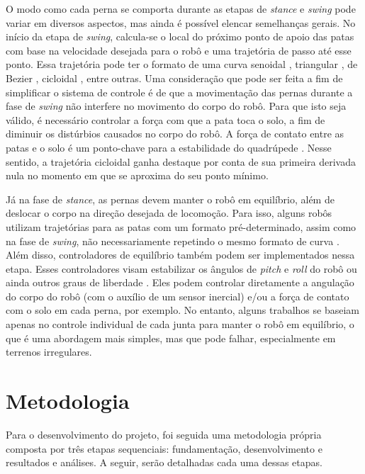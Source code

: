 \documentclass[conference]{IEEEtran}
\begin{document}
O modo como cada perna se comporta durante as etapas de \textit{stance} e \textit{swing} pode variar em diversos aspectos, mas ainda é possível elencar semelhanças gerais. No início da etapa de \textit{swing}, calcula-se o local do próximo ponto de apoio das patas com base na velocidade desejada para o robô e uma trajetória de passo até esse ponto. Essa trajetória pode ter o formato de uma curva senoidal \cite{X.118}, triangular \cite{StanfordPupper}, de Bezier \cite{HackadayQuadruped}, cicloidal \cite{Shi2021} \cite{X.58}, entre outras. Uma consideração que pode ser feita a fim de simplificar o sistema de controle é de que a movimentação das pernas durante a fase de \textit{swing} não interfere no movimento do corpo do robô. Para que isto seja válido, é necessário controlar a força com que a pata toca o solo, a fim de diminuir os distúrbios causados no corpo do robô. A força de contato entre as patas e o solo é um ponto-chave para a estabilidade do quadrúpede \cite{X.118}. Nesse sentido, a trajetória cicloidal ganha destaque por conta de sua primeira derivada nula no momento em que se aproxima do seu ponto mínimo.

Já na fase de \textit{stance}, as pernas devem manter o robô em equilíbrio, além de deslocar o corpo na direção desejada de locomoção. Para isso, alguns robôs utilizam trajetórias para as patas com um formato pré-determinado, assim como na fase de \textit{swing}, não necessariamente repetindo o mesmo formato de curva \cite{X.118, X.58}. Além disso, controladores de equilíbrio também podem ser implementados nessa etapa. Esses controladores visam estabilizar os ângulos de \textit{pitch} e \textit{roll} do robô \cite{Shi2021, StanfordPupper, HackadayQuadruped, Notspot} ou ainda outros graus de liberdade \cite{X.134, Chen2020140736, Zhang2016284}. Eles podem controlar diretamente a angulação do corpo do robô (com o auxílio de um sensor inercial) e/ou a força de contato com o solo em cada perna, por exemplo. No entanto, alguns trabalhos se baseiam apenas no controle individual de cada junta para manter o robô em equilíbrio, o que é uma abordagem mais simples, mas que pode falhar, especialmente em terrenos irregulares.

\section{Metodologia}
Para o desenvolvimento do projeto, foi seguida uma metodologia própria composta por três etapas sequenciais: fundamentação, desenvolvimento e resultados e análises. A seguir, serão detalhadas cada uma dessas etapas.
\end{document}
